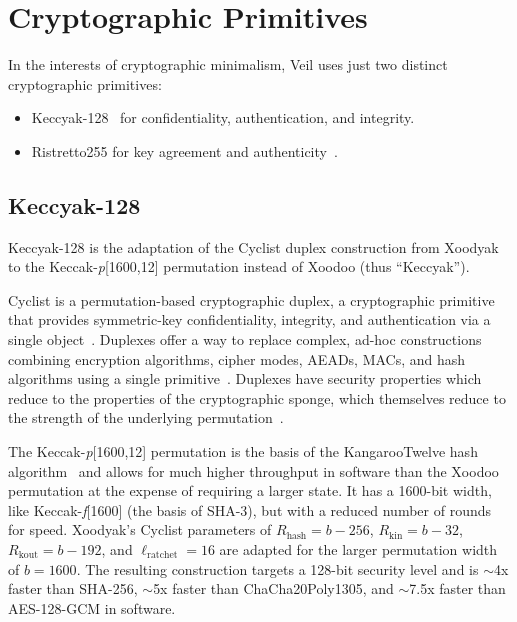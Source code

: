 \section{Cryptographic Primitives}\label{sec:cryptographic-primitives}

In the interests of cryptographic minimalism, Veil uses just two distinct cryptographic primitives:

\begin{itemize}
    \item Keccyak-128~\cite{daemen2020,bertoni2018} for confidentiality, authentication, and integrity.
    \item Ristretto255 for key agreement and authenticity~\cite{deValence2020}.
\end{itemize}

\subsection{Keccyak-128}\label{subsec:keccyak}

Keccyak-128 is the adaptation of the Cyclist duplex construction from Xoodyak~\cite{daemen2020} to the
Keccak-\emph{p}[1600,12] permutation instead of Xoodoo (thus ``Keccyak'').

Cyclist is a permutation-based cryptographic duplex, a cryptographic primitive that provides symmetric-key
confidentiality, integrity, and authentication via a single object~\cite{daemen2020}.
Duplexes offer a way to replace complex, ad-hoc constructions combining encryption algorithms, cipher modes,
AEADs, MACs, and hash algorithms using a single primitive~\cite{daemen2020, bertoni2011duplex}.
Duplexes have security properties which reduce to the properties of the cryptographic sponge, which themselves reduce to
the strength of the underlying permutation~\cite{bertoni2008}.

The Keccak-\emph{p}[1600,12] permutation is the basis of the KangarooTwelve hash algorithm~\cite{bertoni2018} and allows
for much higher throughput in software than the Xoodoo permutation at the expense of requiring a larger state.
It has a 1600-bit width, like Keccak-\emph{f}[1600] (the basis of SHA-3), but with a reduced number of rounds for speed.
Xoodyak's Cyclist parameters of $R_\text{hash}=b-256$, $R_\text{kin}=b-32$, $R_\text{kout}=b-192$, and
$\ell_\text{ratchet}=16$ are adapted for the larger permutation width of $b=1600$.
The resulting construction targets a 128-bit security level and is $\sim$4x faster than SHA-256, $\sim$5x faster
than ChaCha20Poly1305, and $\sim$7.5x faster than AES-128-GCM in software.

